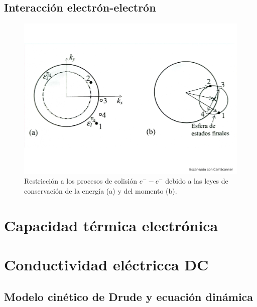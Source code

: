 \subsection{Interacción electrón-electrón}

\begin{figure}[h!] \centering
    \includegraphics[scale=0.5]{Cuerpo/Ch_06/Fotos libro 4.pdf}
    \caption{Restricción a los procesos de colisión $e^- - e^-$ debido a las leyes de conservación de la energía (a) y del momento (b).}
    \label{Fig:06-04}
\end{figure}  

\section{Capacidad térmica electrónica}

\section{Conductividad eléctricca DC}

\subsection{Modelo cinético de Drude y ecuación dinámica}

